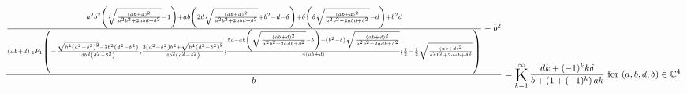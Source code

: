 \documentclass{article}
\newcommand{\bigK}{\mathop{\raisebox{-5pt}{\huge K}}}
\begin{document}
\[\frac{\frac{a^2 b^2 \left(\sqrt{\frac{(a b+d)^2}{a^2 b^2+2 a b d+\delta ^2}}-1\right)+a b \left(2 d \sqrt{\frac{(a b+d)^2}{a^2 b^2+2 a b d+\delta ^2}}+b^2-d-\delta \right)+\delta  \left(\delta  \sqrt{\frac{(a b+d)^2}{a^2 b^2+2 a b d+\delta ^2}}-d\right)+b^2 d}{(a b+d) \, _2F_1\left(-\frac{\sqrt{b^4 \left(d^2-\delta ^2\right)^2}-3 b^2 \left(d^2-\delta ^2\right)}{4 b^2 \left(d^2-\delta ^2\right)},\frac{3 \left(d^2-\delta ^2\right) b^2+\sqrt{b^4 \left(d^2-\delta ^2\right)^2}}{4 b^2 \left(d^2-\delta ^2\right)};\frac{5 d-a b \left(\sqrt{\frac{(a b+d)^2}{a^2 b^2+2 a d b+\delta ^2}}-5\right)+\left(b^2-\delta \right) \sqrt{\frac{(a b+d)^2}{a^2 b^2+2 a d b+\delta ^2}}}{4 (a b+d)};\frac{1}{2}-\frac{1}{2} \sqrt{\frac{(a b+d)^2}{a^2 b^2+2 a d b+\delta ^2}}\right)}-b^2}{b}=\bigK_{k=1}^{\infty}\frac{d k+(-1)^k k \delta }{b+\left(1+(-1)^k\right) a k}\text{ for }(a,b,d,\delta )\in \mathbb{C}^4\] 
\end{document}

